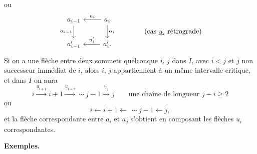 \documentclass[11pt]{article}
\newcommand{\printedpage}[1]{\marginpar{\footnotesize p.~#1}}
\newcommand{\msp}[1]{\marginpar{\footnotesize [#1]}}
\begin{document}
\printedpage{10}
ou
\[
\begin{tikzcd}
a_{i-1} \arrow[d, "\alpha_{i-1}"'] & a_i \arrow[l, "u_i"'] \arrow[d, "\alpha_i"] \\
a'_{i-1} & a'_i. \arrow[l, "u'_i"']
\end{tikzcd}
\qquad\qquad \text{(cas $\underline{u}_i$ rétrograde)}
\]
Si on a une flèche entre deux sommets quelconque $i$, $j$ dans $I$, avec $i < j$ et $j$ non successeur immédiat de $i$, alors $i$, $j$ appartiennent à un même intervalle critique, et dans $I$ on aura %
\[
i \xrightarrow{\underline{u}_{i+1}} i+1 \xrightarrow{\underline{u}_{i+2}}\ \cdots\ j-1 \xrightarrow{\underline{u}_j} j \qquad \text{une chaîne de longueur } j-i \geq 2 %
\]
ou
\[
i \longleftarrow i+1 \longleftarrow\ \ \cdots\ j-1 \longleftarrow j,
\]
et la flèche correspondante entre $a_i$ et $a_j$ s'obtient en composant les flèches $u_i$ correspondantes.

\msp{page 15}

\textbf{Exemples.}
\end{document}
